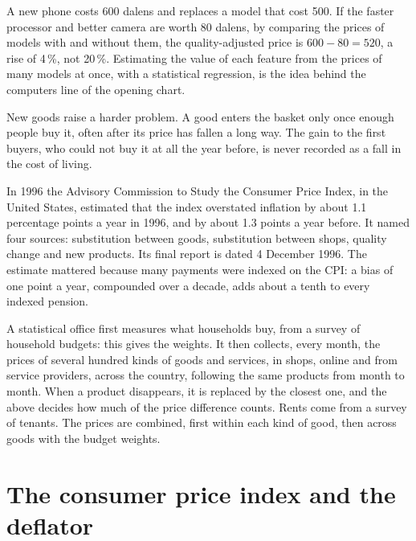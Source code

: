 A new phone costs 600 dalens and replaces a model that cost 500. If the faster processor and better camera are worth 80 dalens, by comparing the prices of
models with and without them, the quality-adjusted price is $600 - 80 = 520$, a rise of 4\,\%, not 20\,\%. Estimating the value of each feature from the prices
of many models at once, with a statistical regression, is the idea behind the computers line of the opening chart.

New goods raise a harder problem. A good enters the basket only once enough people buy it, often after its price has fallen a long way. The gain to the first
buyers, who could not buy it at all the year before, is never recorded as a fall in the cost of living.

\begin{record}
In 1996 the Advisory Commission to Study the Consumer Price Index, in the United States, estimated that the index overstated inflation by about
1.1 percentage points a year in 1996, and by about 1.3 points a year before. It named four sources: substitution between goods, substitution between shops,
quality change and new products. Its final report is dated 4 December 1996. The estimate mattered because many payments were indexed on the CPI: a bias of one
point a year, compounded over a decade, adds about a tenth to every indexed pension.
\end{record}

\begin{measure}
A statistical office first measures what households buy, from a survey of household budgets: this gives the weights. It then collects, every month, the prices
of several hundred kinds of goods and services, in shops, online and from service providers, across the country, following the same products from month to
month. When a product disappears, it is replaced by the closest one, and the  above decides how much of the price difference counts. Rents
come from a survey of tenants. The prices are combined, first within each kind of good, then across goods with the budget weights.
\end{measure}

\section{The consumer price index and the deflator}\label{sec:g10:price-indices:cpi-deflator}

